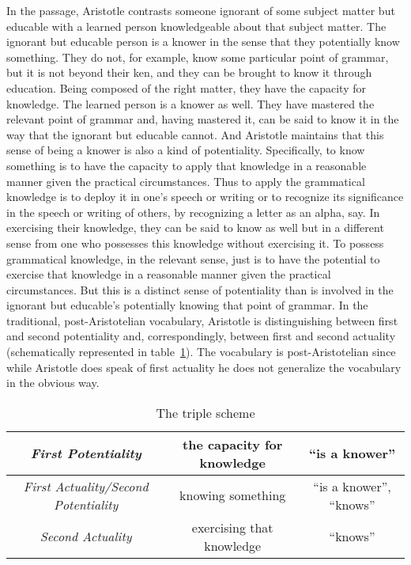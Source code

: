 In the passage, Aristotle contrasts someone ignorant of some subject matter but educable with a learned person knowledgeable about that subject matter. The ignorant but educable person is a knower in the sense that they potentially know something. They do not, for example, know some particular point of grammar, but it is not beyond their ken, and they can be brought to know it through education. Being composed of the right matter, they have the capacity for knowledge. The learned person is a knower as well. They have mastered the relevant point of grammar and, having mastered it, can be said to know it in the way that the ignorant but educable cannot. And Aristotle maintains that this sense of being a knower is also a kind of potentiality. Specifically, to know something is to have the capacity to apply that knowledge in a reasonable manner given the practical circumstances. Thus to apply the grammatical knowledge is to deploy it in one's speech or writing or to recognize its significance in the speech or writing of others, by recognizing a letter as an alpha, say. In exercising their knowledge, they can be said to know as well but in a different sense from one who possesses this knowledge without exercising it. To possess grammatical knowledge, in the relevant sense, just is to have the potential to exercise that knowledge in a reasonable manner given the practical circumstances. But this is a distinct sense of potentiality than is involved in the ignorant but educable's potentially knowing that point of grammar.  In the traditional, post-Aristotelian vocabulary, Aristotle is distinguishing between first and second potentiality and, correspondingly, between first and second actuality (schematically represented in table~\ref{tab:triple}). The vocabulary is post-Aristotelian since while Aristotle does speak of first actuality he does not generalize the vocabulary in the obvious way.

\begin{table}[htbp]
	\footnotesize
	\centering
		\begin{tabular}{ccc}
			\hline
			\emph{First Potentiality} & the capacity for knowledge & ``is a knower''\\
			\hline
			\emph{First Actuality/Second Potentiality} & knowing something & ``is a knower'', ``knows''\\
			\hline
			\emph{Second Actuality} & exercising that knowledge & ``knows''\\
			\hline
		\end{tabular}
	\caption{The triple scheme}
	\label{tab:triple}
\end{table}


